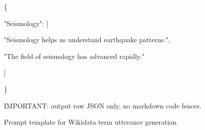 \begin{figure}[t]
\begin{tcolorbox}
{\{\par
\hspace*{1em}"Seismology": [\par
\hspace*{2em}"Seismology helps us understand earthquake patterns.",\par
\hspace*{2em}"The field of seismology has advanced rapidly."\par
\hspace*{1em}]\par
\}\par
\vspace{0.5em}
IMPORTANT: output raw JSON only, no markdown code fences.\par
}
\end{tcolorbox}
\caption{Prompt template for Wikidata term utterance generation.}
\label{fig:wikidata_utt_gen}
\end{figure}
